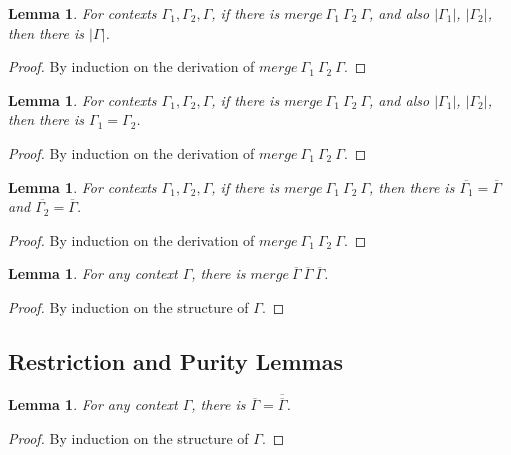\documentclass{article}
\newtheorem{lemma}[theorem]{Lemma}
\theoremstyle{definition}
\newcommand{\pure}[1]{|#1|}
\newcommand{\mrg}[3]{merge\ {#1}\ {#2}\ {#3}}
\begin{document}
\begin{lemma}\label{mergepurepure}
  For contexts $\Gamma_1, \Gamma_2, \Gamma$, if there is $\mrg{\Gamma_1}{\Gamma_2}{\Gamma}$, and also $\pure{\Gamma_1}$, $\pure{\Gamma_2}$, then there is $\pure{\Gamma}$.
\end{lemma}
\begin{proof}
  By induction on the derivation of $\mrg{\Gamma_1}{\Gamma_2}{\Gamma}$.
\end{proof}

\begin{lemma}\label{mergepureeq}
  For contexts $\Gamma_1, \Gamma_2, \Gamma$, if there is $\mrg{\Gamma_1}{\Gamma_2}{\Gamma}$, and also $\pure{\Gamma_1}$, $\pure{\Gamma_2}$, then there is $\Gamma_1 = \Gamma_2$.
\end{lemma}
\begin{proof}
  By induction on the derivation of $\mrg{\Gamma_1}{\Gamma_2}{\Gamma}$.
\end{proof}

\begin{lemma}\label{mergerere}
  For contexts $\Gamma_1, \Gamma_2, \Gamma$, if there is $\mrg{\Gamma_1}{\Gamma_2}{\Gamma}$, then there is $\overline{\Gamma_1} = \overline{\Gamma}$ and $\overline{\Gamma_2} = \overline{\Gamma}$.
\end{lemma}
\begin{proof}
  By induction on the derivation of $\mrg{\Gamma_1}{\Gamma_2}{\Gamma}$.
\end{proof}

\begin{lemma}\label{mergererere}
  For any context $\Gamma$, there is $\mrg{\overline{\Gamma}}{\overline{\Gamma}}{\overline{\Gamma}}$.
\end{lemma}
\begin{proof}
  By induction on the structure of $\Gamma$.
\end{proof}

\subsection{Restriction and Purity Lemmas}

\begin{lemma}\label{rere}
  For any context $\Gamma$, there is $\overline{\Gamma} = \overline{\overline{\Gamma}}$.
\end{lemma}
\begin{proof}
  By induction on the structure of $\Gamma$.
\end{proof}
\end{document}
